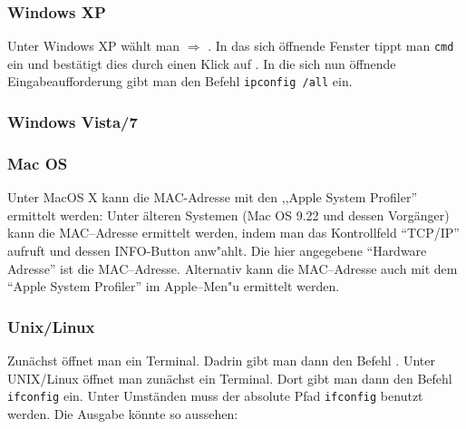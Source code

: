 \subsubsection*{Windows XP}

Unter Windows XP wählt man  $\Rightarrow$
.  In das sich öffnende Fenster tippt man  \texttt{cmd}
ein und bestätigt dies durch einen Klick auf . In die sich
nun öffnende Eingabeaufforderung gibt man den Befehl \texttt{ipconfig /all}
ein. %

\subsubsection*{Windows Vista/7}


\subsubsection*{Mac OS}

Unter MacOS X kann die MAC-Adresse mit den ,,Apple System Profiler''
ermittelt werden: %
Unter älteren Systemen (Mac OS 9.22 und dessen Vorgänger) kann 
die MAC--Adresse ermittelt werden, indem man das
Kontrollfeld "`TCP/IP"' aufruft und dessen INFO-Button anw"ahlt. Die hier
angegebene "`Hardware Adresse"' ist die MAC--Adresse. Alternativ kann die
MAC--Adresse auch mit dem "`Apple System Profiler"' im Apple--Men"u ermittelt
werden. 

\subsubsection*{Unix/Linux}
Zunächst öffnet man ein Terminal. Dadrin gibt man dann den Befehl 
. Unter
\glossar UNIX/Linux öffnet man zunächst ein Terminal. Dort gibt man
dann den Befehl \texttt{ifconfig} ein. Unter Umständen muss der
absolute Pfad \texttt{ifconfig} benutzt werden. Die Ausgabe könnte so
aussehen: %

